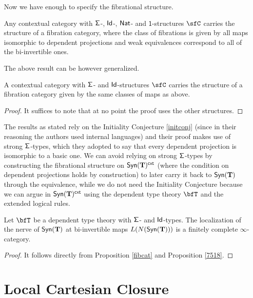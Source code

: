 Now we have enough to specify the fibrational structure.

\begin{prop}
  Any contextual category with $\operatorname{\mathsf{\Sigma}}$-, $\operatorname{\mathsf{Id}}$-, $\operatorname{\mathsf{Nat}}$- and
  $\mathsf{1}$-structures $\sfC$ carries the structure of a fibration category,
  where the class of fibrations is given by all maps isomorphic to dependent
  projections and weak equivalences correspond to all of the bi-invertible ones.
\end{prop}

The above result can be however generalized.

\begin{prop}\label{fibcat}
  A contextual category with $\operatorname{\mathsf{\Sigma}}$- and $\operatorname{\mathsf{Id}}$-structures $\sfC$ carries
  the structure of a fibration category given by the same classes of maps as
  above.
\end{prop}
\begin{proof}
  It suffices to note that at no point the proof uses the other structures.
\end{proof}

\begin{rmk}
  The results as stated rely on the Initiality Conjecture \ref{initconj} (since
  in their reasoning the authors used internal languages) and their proof makes
  use of strong $\operatorname{\mathsf{\Sigma}}$-types, which they adopted to say that every dependent
  projection is isomorphic to a basic one. We
  can avoid relying on strong $\operatorname{\mathsf{\Sigma}}$-types by constructing the fibrational
  structure on $\mathsf{Syn}(\mathbf{T})^{\operatorname{\mathsf{cxt}}}$ (where the condition on dependent projections
  holds by construction) to later carry it back to $\mathsf{Syn}(\mathbf{T})$ through the
  equivalence, while we do not need the Initiality Conjecture because we can
  argue in $\mathsf{Syn}(\mathbf{T})^{\operatorname{\mathsf{cxt}}}$ using the dependent type theory $\bfT$ and the
  extended logical rules.
\end{rmk}

\begin{cor}\label{fincompl1}
  Let $\bfT$ be a dependent type theory with $\operatorname{\mathsf{\Sigma}}$- and $\operatorname{\mathsf{Id}}$-types. The
  localization of the nerve of $\mathsf{Syn}(\mathbf{T})$ at bi-invertible maps $L(N(\mathsf{Syn}(\mathbf{T})))$
  is a finitely complete $\infty$-category.
\end{cor}
\begin{proof}
  It follows directly from Proposition \ref{fibcat} and Proposition \ref{7518}.
\end{proof}

\section{Local Cartesian Closure}

